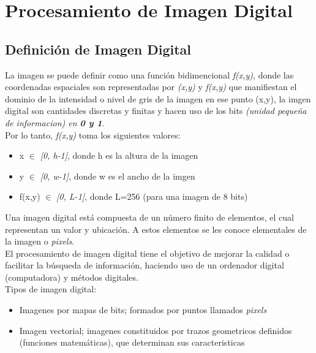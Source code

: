 \documentclass[12pt,a4paper]{book}
\begin{document}

\section{Procesamiento de Imagen Digital}
\subsection{Definición de Imagen Digital}
La imagen se puede definir como una función bidimencional \textit{f(x,y)}, donde las coordenadas espaciales son representadas por \textit{(x,y)} y \textit{f(x,y)} que manifiestan el dominio de la intensidad o nivel de gris de la imagen en ese punto (x,y), la imgen digital son cantidades discretas y finitas y hacen uso de los bits \textit{(unidad pequeña de informacion) en \textbf{0 y 1}}.\\

Por lo tanto, \textit{f(x,y)} toma los siguientes valores:
\begin{itemize}
     \item x $\in$ \textit{[0, h-1]}, donde h es la altura de la imagen
     \item y $\in$ \textit{[0, w-1]}, donde w es el ancho de la imgen
     \item f(x,y) $\in$ \textit{[0, L-1]}, donde L=256 (para una imagen de 8 bits)
\end{itemize}

Una imagen digital está compuesta de un número finito de elementos, el cual representan un valor y ubicación. A estos elementos se les conoce elementales de la imagen o \textit{pixels}.\\
El procesamiento de imagen digital tiene el objetivo de mejorar la calidad o facilitar la búsqueda de información, haciendo uso de un ordenador digital (computadora) y métodos digitales.\\
Tipos de imagen digital:
   \begin{itemize}
     \item Imagenes por mapas de bits; formados por puntos llamados \textit{pixels}
     \item Imagen vectorial; imagenes constituidos por trazos geometricos definidos (funciones matemáticas), que determinan sus caracteristicas  
   \end{itemize}    
\end{document}
